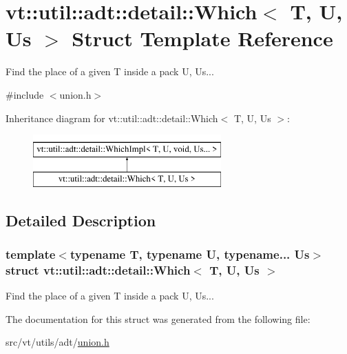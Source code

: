 \hypertarget{structvt_1_1util_1_1adt_1_1detail_1_1_which}{}\section{vt\+:\+:util\+:\+:adt\+:\+:detail\+:\+:Which$<$ T, U, Us $>$ Struct Template Reference}
\label{structvt_1_1util_1_1adt_1_1detail_1_1_which}


Find the place of a given {\ttfamily T} inside a pack {\ttfamily U}, Us...  




{\ttfamily \#include $<$union.\+h$>$}

Inheritance diagram for vt\+:\+:util\+:\+:adt\+:\+:detail\+:\+:Which$<$ T, U, Us $>$\+:\begin{figure}[H]
\begin{center}
\leavevmode
\includegraphics[height=2.000000cm]{structvt_1_1util_1_1adt_1_1detail_1_1_which}
\end{center}
\end{figure}


\subsection{Detailed Description}
\subsubsection*{template$<$typename T, typename U, typename... Us$>$\newline
struct vt\+::util\+::adt\+::detail\+::\+Which$<$ T, U, Us $>$}

Find the place of a given {\ttfamily T} inside a pack {\ttfamily U}, Us... 

The documentation for this struct was generated from the following file\+:\begin{DoxyCompactItemize}
\item 
src/vt/utils/adt/\hyperlink{union_8h}{union.\+h}\end{DoxyCompactItemize}
